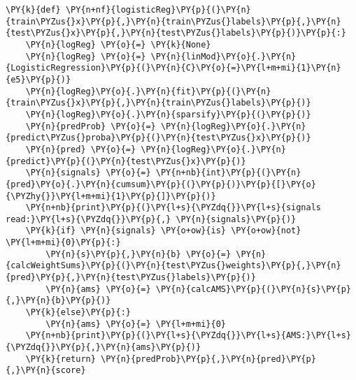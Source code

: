 
{\par%
\vspace{-1\baselineskip}%
}%
\begin{notebookcell}[]%
\begin{addmargin}[\cellleftmargin]{0em}%
{\smaller%
\par%
%
\vspace{-1\smallerfontscale}%
\begin{Verbatim}[commandchars=\\\{\}]
\PY{k}{def} \PY{n+nf}{logisticReg}\PY{p}{(}\PY{n}{train\PYZus{}x}\PY{p}{,}\PY{n}{train\PYZus{}labels}\PY{p}{,}\PY{n}{test\PYZus{}x}\PY{p}{,}\PY{n}{test\PYZus{}labels}\PY{p}{)}\PY{p}{:}
    \PY{n}{logReg} \PY{o}{=} \PY{k}{None}
    \PY{n}{logReg} \PY{o}{=} \PY{n}{linMod}\PY{o}{.}\PY{n}{LogisticRegression}\PY{p}{(}\PY{n}{C}\PY{o}{=}\PY{l+m+mi}{1}\PY{n}{e5}\PY{p}{)}
    \PY{n}{logReg}\PY{o}{.}\PY{n}{fit}\PY{p}{(}\PY{n}{train\PYZus{}x}\PY{p}{,}\PY{n}{train\PYZus{}labels}\PY{p}{)}
    \PY{n}{logReg}\PY{o}{.}\PY{n}{sparsify}\PY{p}{(}\PY{p}{)}
    \PY{n}{predProb} \PY{o}{=} \PY{n}{logReg}\PY{o}{.}\PY{n}{predict\PYZus{}proba}\PY{p}{(}\PY{n}{test\PYZus{}x}\PY{p}{)}
    \PY{n}{pred} \PY{o}{=} \PY{n}{logReg}\PY{o}{.}\PY{n}{predict}\PY{p}{(}\PY{n}{test\PYZus{}x}\PY{p}{)}
    \PY{n}{signals} \PY{o}{=} \PY{n+nb}{int}\PY{p}{(}\PY{n}{pred}\PY{o}{.}\PY{n}{cumsum}\PY{p}{(}\PY{p}{)}\PY{p}{[}\PY{o}{\PYZhy{}}\PY{l+m+mi}{1}\PY{p}{]}\PY{p}{)}  
    \PY{n+nb}{print}\PY{p}{(}\PY{l+s}{\PYZdq{}}\PY{l+s}{signals read:}\PY{l+s}{\PYZdq{}}\PY{p}{,} \PY{n}{signals}\PY{p}{)}
    \PY{k}{if} \PY{n}{signals} \PY{o+ow}{is} \PY{o+ow}{not} \PY{l+m+mi}{0}\PY{p}{:}
        \PY{n}{s}\PY{p}{,}\PY{n}{b} \PY{o}{=} \PY{n}{calcWeightSums}\PY{p}{(}\PY{n}{test\PYZus{}weights}\PY{p}{,}\PY{n}{pred}\PY{p}{,}\PY{n}{test\PYZus{}labels}\PY{p}{)}
        \PY{n}{ams} \PY{o}{=} \PY{n}{calcAMS}\PY{p}{(}\PY{n}{s}\PY{p}{,}\PY{n}{b}\PY{p}{)}
    \PY{k}{else}\PY{p}{:}
        \PY{n}{ams} \PY{o}{=} \PY{l+m+mi}{0}
    \PY{n+nb}{print}\PY{p}{(}\PY{l+s}{\PYZdq{}}\PY{l+s}{AMS:}\PY{l+s}{\PYZdq{}}\PY{p}{,}\PY{n}{ams}\PY{p}{)}
    \PY{k}{return} \PY{n}{predProb}\PY{p}{,}\PY{n}{pred}\PY{p}{,}\PY{n}{score}
\end{Verbatim}
%
\par%
\vspace{-1\smallerfontscale}}%
\end{addmargin}
\end{notebookcell}


